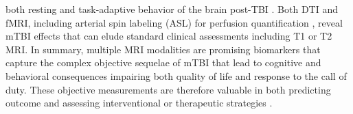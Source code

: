 both resting and task-adaptive behavior of the brain post-TBI
\cite{Roy2010,Mayer2011,Scheibel2012,Stevens2012}.  Both DTI and fMRI,
including arterial spin labeling (ASL) for perfusion quantification
\cite{Ge2009,Grossman2013}, reveal mTBI effects that can elude 
standard clinical assessments including T1 or T2 MRI.
In summary, multiple MRI modalities are promising biomarkers that 
capture the complex objective sequelae of mTBI that lead to cognitive and behavioral consequences
impairing both quality of life and response to the call of duty.
These objective measurements are therefore valuable in both predicting
outcome and assessing interventional or therapeutic strategies \cite{Roy2010,Rigg2011,Niemeier2011}.

